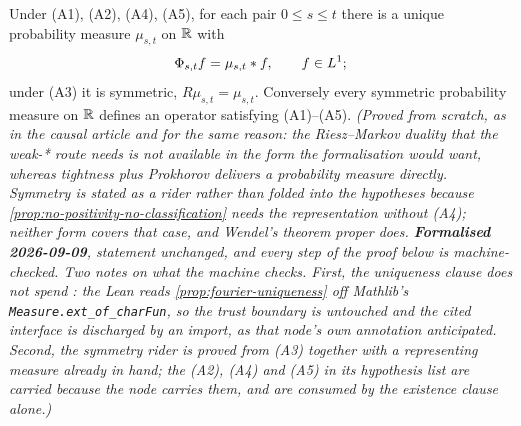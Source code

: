 \begin{lemma}[representation]\label{lem:convolution-representation}
\leanok
{}
Under (A1), (A2), (A4), (A5), for each pair $0 \le s \le t$ there is a unique probability
measure $\mu_{s,t}$ on $\mathbb{R}$ with
\[
  \Phi_{s,t} f = \mu_{s,t} * f, \qquad f \in L^1 ;
\]
under (A3) it is symmetric, $R\mu_{s,t} = \mu_{s,t}$. Conversely every symmetric probability
measure on $\mathbb{R}$ defines an operator satisfying (A1)--(A5).
\statusT\quad\emph{(Proved from scratch, as in the causal article and for the same reason:
the Riesz--Markov duality that the weak-* route needs is not available in the form the
formalisation would want, whereas tightness plus Prokhorov delivers a probability measure
directly. Symmetry is stated as a rider rather than folded into the hypotheses because
\ref{prop:no-positivity-no-classification} needs the representation without (A4); neither
form covers that case, and Wendel's theorem proper does. \textbf{Formalised 2026-09-09},
statement unchanged, and every step of the proof below is machine-checked. Two notes on what
the machine checks. First, the uniqueness clause does \emph{not} spend : the Lean
reads \ref{prop:fourier-uniqueness} off Mathlib's \texttt{Measure.ext\_of\_charFun}, so the
trust boundary is untouched and the cited interface is discharged by an import, as that node's
own annotation anticipated. Second, the symmetry rider is proved from (A3) together with a
representing measure already in hand; the (A2), (A4) and (A5) in its hypothesis list are
carried because the node carries them, and are consumed by the existence clause alone.)}
\end{lemma}

